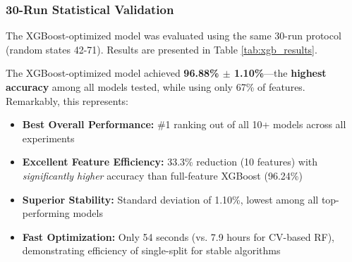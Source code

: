 \documentclass[12pt, a4paper]{article}
\begin{document}
\subsubsection{30-Run Statistical Validation}
The XGBoost-optimized model was evaluated using the same 30-run protocol (random states 42-71). Results are presented in Table \ref{tab:xgb_results}.

\begin{table}[H]
    \centering
    \caption{XGBoost-Optimized Model Performance Summary (30 Runs)}
    \label{tab:xgb_results}
\end{table}

The XGBoost-optimized model achieved \textbf{96.88\% $\pm$ 1.10\%}—the \textbf{highest accuracy} among all models tested, while using only 67\% of features. Remarkably, this represents:
\begin{itemize}
    \item \textbf{Best Overall Performance:} \#1 ranking out of all 10+ models across all experiments
    \item \textbf{Excellent Feature Efficiency:} 33.3\% reduction (10 features) with \textit{significantly higher} accuracy than full-feature XGBoost (96.24\%)
    \item \textbf{Superior Stability:} Standard deviation of 1.10\%, lowest among all top-performing models
    \item \textbf{Fast Optimization:} Only 54 seconds (vs. 7.9 hours for CV-based RF), demonstrating efficiency of single-split for stable algorithms
\end{itemize}
\end{document}
